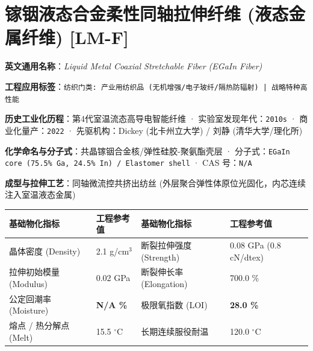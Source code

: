 \documentclass[11pt,openright,twoside,UTF8]{ctexbook}
\begin{document}
\section{镓铟液态合金柔性同轴拉伸纤维 (液态金属纤维) [LM-F]}
\label{sec:lm-f}

\noindent\textbf{英文通用名称}：\textit{Liquid Metal Coaxial Stretchable Fiber (EGaIn Fiber)}\par
\noindent\textbf{工程应用标签}：\texttt{纺织门类: 产业用纺织品 (无机增强/电子玻纤/隔热防辐射) | 战略特种高性能}\par
\noindent\textbf{历史工业化历程}：第4代室温流态高导电智能纤维 · 实验室发现年代：\texttt{2010s} · 商业化量产：\texttt{2022} · 先驱机构：Dickey (北卡州立大学) / 刘静 (清华大学/理化所)\par
\noindent\textbf{化学命名与分子式}：共晶镓铟合金核/弹性硅胶-聚氨酯壳层 · 分子式：\texttt{EGaIn core (75.5\% Ga, 24.5\% In) / Elastomer shell} · CAS 号：\texttt{N/A}\par
\noindent\textbf{成型与拉伸工艺}：同轴微流控共挤出纺丝 (外层聚合弹性体原位光固化，内芯连续注入室温液态金属)\par

\vspace{0.15cm}
\begin{center}
\small
\begin{tabularx}{\textwidth}{p{3.8cm}Xp{3.8cm}X}
\toprule
\textbf{基础物化指标} & \textbf{工程参考值} & \textbf{基础物化指标} & \textbf{工程参考值} \\
\midrule
晶体密度 (Density) & 2.1 g/cm$^3$ & 断裂拉伸强度 (Strength) & 0.08 GPa (0.8 cN/dtex) \\
拉伸初始模量 (Modulus) & 0.02 GPa & 断裂伸长率 (Elongation) & 700.0 \% \\
公定回潮率 (Moisture) & \textbf{N/A \%} & 极限氧指数 (LOI) & \textbf{28.0 \%} \\
熔点 / 热分解点 (Melt) & 15.5 $^\circ\mathrm{C}$ & 长期连续服役耐温 & 120.0 $^\circ\mathrm{C}$ \\
\bottomrule
\end{tabularx}
\end{center}
\vspace{0.15cm}
\end{document}
